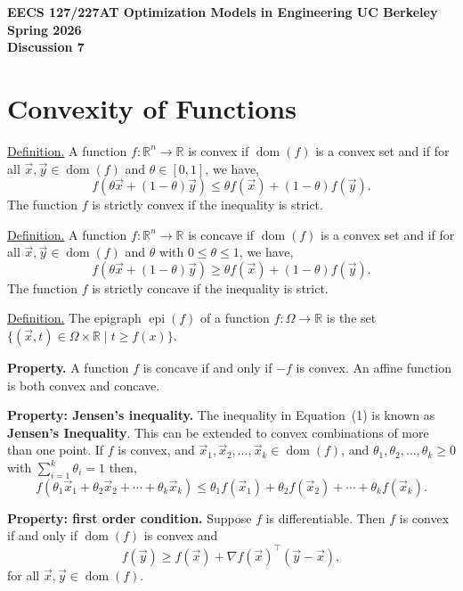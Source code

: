 \documentclass[10pt]{article}
\newcommand{\RR}{\mathbb{R}}
\DeclareMathOperator{\dom}{dom}
\DeclareMathOperator{\epi}{epi}
\begin{document}
\begin{center}
    {\large\bfseries EECS 127/227AT \quad Optimization Models in Engineering \quad UC Berkeley \quad Spring 2026}\\[6pt]
    {\LARGE\bfseries Discussion 7}
\end{center}

\section{Convexity of Functions}

\underline{Definition.} A function $f\colon \RR^n \to \RR$ is convex if $\dom(f)$ is a convex set and if for all $\vec{x}, \vec{y} \in \dom(f)$ and $\theta \in [0,1]$, we have,
\begin{equation}
    f(\theta \vec{x} + (1-\theta)\vec{y}) \leq \theta f(\vec{x}) + (1-\theta) f(\vec{y}).
\end{equation}
The function $f$ is strictly convex if the inequality is strict.

\underline{Definition.} A function $f\colon \RR^n \to \RR$ is concave if $\dom(f)$ is a convex set and if for all $\vec{x}, \vec{y} \in \dom(f)$ and $\theta$ with $0 \leq \theta \leq 1$, we have,
\begin{equation}
    f(\theta \vec{x} + (1-\theta)\vec{y}) \geq \theta f(\vec{x}) + (1-\theta) f(\vec{y}).
\end{equation}
The function $f$ is strictly concave if the inequality is strict.

\underline{Definition.} The epigraph $\epi(f)$ of a function $f\colon \Omega \to \RR$ is the set $\{(\vec{x}, t) \in \Omega \times \RR \mid t \geq f(x)\}$.

\textbf{Property.} A function $f$ is concave if and only if $-f$ is convex. An affine function is both convex and concave.

\textbf{Property: Jensen's inequality.} The inequality in Equation~(1) is known as \textbf{Jensen's Inequality}. This can be extended to convex combinations of more than one point. If $f$ is convex, and $\vec{x}_1, \vec{x}_2, \ldots, \vec{x}_k \in \dom(f)$, and $\theta_1, \theta_2, \ldots, \theta_k \geq 0$ with $\sum_{i=1}^{k} \theta_i = 1$ then,
\begin{equation}
    f(\theta_1 \vec{x}_1 + \theta_2 \vec{x}_2 + \cdots + \theta_k \vec{x}_k) \leq \theta_1 f(\vec{x}_1) + \theta_2 f(\vec{x}_2) + \cdots + \theta_k f(\vec{x}_k).
\end{equation}

\textbf{Property: first order condition.} Suppose $f$ is differentiable. Then $f$ is convex if and only if $\dom(f)$ is convex and
\begin{equation}
    f(\vec{y}) \geq f(\vec{x}) + \nabla f(\vec{x})^\top (\vec{y} - \vec{x}),
\end{equation}
for all $\vec{x}, \vec{y} \in \dom(f)$.
\end{document}
